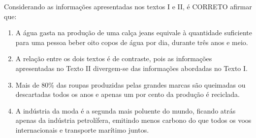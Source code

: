 Considerando as informações apresentadas nos textos I e II, é CORRETO afirmar que:
\begin{enumerate}
\item A água gasta na produção de uma calça jeans equivale à quantidade suficiente para uma pessoa beber oito copos de água por dia, durante três anos e meio.
\item A relação entre os dois textos é de contraste, pois as informações apresentadas no Texto II divergem-se das informações abordadas no Texto I.
\item Mais de 80\% das roupas produzidas pelas grandes marcas são queimadas ou descartadas todos os anos e apenas um por cento da produção é reciclada.
\item A indústria da moda é a segunda mais poluente do mundo, ficando atrás apenas da indústria petrolífera, emitindo menos carbono do que todos os voos internacionais e transporte marítimo juntos.
\end{enumerate}
